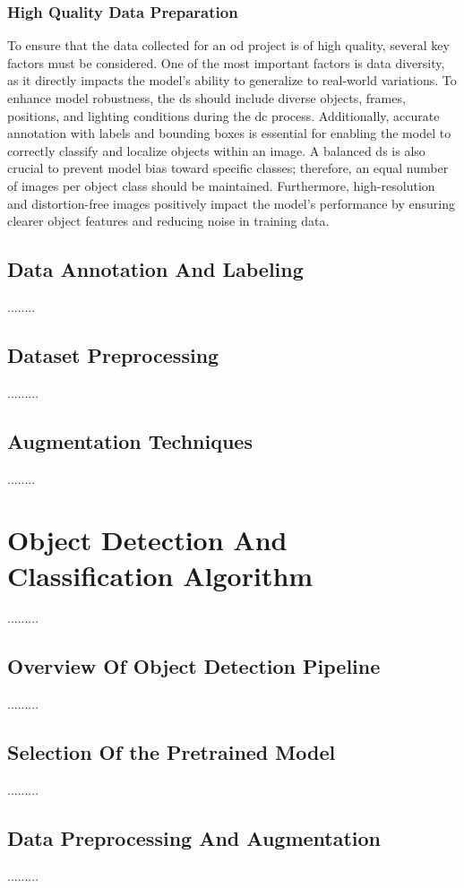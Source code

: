 \subsubsection{High Quality Data Preparation}
To ensure that the data collected for an \gls{od} project is of high quality, several key factors must be considered. One of the most important factors is data diversity, as it directly impacts the model’s ability to generalize to real-world variations. To enhance model robustness, the \gls{ds} should include diverse objects, frames, positions, and lighting conditions during the \gls{dc} process. Additionally, accurate annotation with labels and bounding boxes is essential for enabling the model to correctly classify and localize objects within an image. A balanced \gls{ds} is also crucial to prevent model bias toward specific classes; therefore, an equal number of images per object class should be maintained. Furthermore, high-resolution and distortion-free images positively impact the model’s performance by ensuring clearer object features and reducing noise in training data.



\subsection{Data Annotation And Labeling}
........
\subsection{Dataset Preprocessing}
.........
\subsection{Augmentation Techniques}
........

\section{Object Detection And Classification Algorithm}
.........
\subsection{Overview Of Object Detection Pipeline}
.........
\subsection{Selection Of the Pretrained Model}
.........
\subsection{Data Preprocessing And Augmentation}
.........
